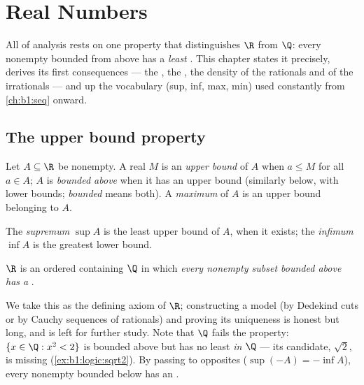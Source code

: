 \chapter{Real Numbers}\label{ch:b1:reals}

All of analysis rests on one property that distinguishes $\R$ from
$\Q$: every nonempty  bounded from above has a \emph{least} . This chapter states it precisely, derives its first
consequences --- the , the , the
density of the rationals and of the irrationals --- and  up the
vocabulary (sup, inf, max, min) used constantly from
\cref{ch:b1:seq} onward.

\section{The upper bound property}

\begin{definition}\label{def:b1:reals:bounds}
Let $A \subseteq \R$ be nonempty. A real $M$ is an \emph{upper
bound} of $A$ when $a \leq M$ for all $a \in A$;
$A$ is \emph{bounded above} when it has an upper bound (similarly
below, with lower bounds; \emph{bounded} means both). A
\emph{maximum} of $A$ is an upper bound belonging to $A$.

The \emph{supremum} $\sup A$ is the least upper bound
of $A$, when it exists; the \emph{infimum} $\inf A$ is
the greatest lower bound.
\end{definition}

\begin{theorem}\label{thm:b1:reals:sup}
$\R$ is an ordered  containing $\Q$ in which \emph{every
nonempty subset bounded above has a }.
\end{theorem}
\admitted

\begin{remark}
We take this as the defining axiom of $\R$; constructing a model (by
Dedekind cuts or by Cauchy sequences of rationals) and proving its
uniqueness is honest but long, and is left for further study. Note
that $\Q$ fails the property: $\{x \in \Q : x^2 < 2\}$ is bounded
above but has no least  \emph{in $\Q$} --- its candidate,
$\sqrt 2$, is missing (\cref{ex:b1:logic:sqrt2}). By passing to
opposites ($\sup(-A) = -\inf A$), every nonempty  bounded below
has an .
\end{remark}

